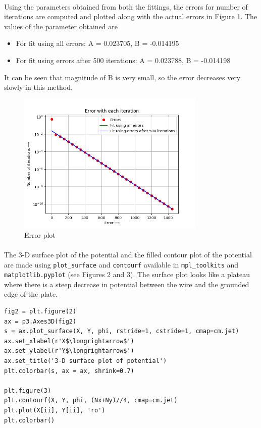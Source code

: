 \documentclass[12pt, a4paper]{article}
\begin{document}
\paragraph*{}
Using the parameters obtained from both the fittings, the errors for number of iterations are computed and plotted along with the actual errors in Figure 1. The values of the parameter obtained are 
\begin{itemize}
\item For fit using all errors: A = 0.023705, B = -0.014195
\item For fit using errors after 500 iterations: A = 0.023788, B = -0.014198
\end{itemize}
It can be seen that magnitude of B is very small, so the error decreases very slowly in this method.

\begin{figure}
\centering
\includegraphics[width=0.8\textwidth]{Figure_1.png}
\caption{Error plot}
\end{figure}

\paragraph*{}
The 3-D surface plot of the potential and the filled contour plot of the potential are made using \texttt{plot\_surface} and \texttt{contourf} available in \texttt{mpl\_toolkits} and \\ \texttt{matplotlib.pyplot} (see Figures 2 and 3). The surface plot looks like a plateau where there is a steep decrease in potential between the wire and the grounded edge of the plate.

\begin{lstlisting}
fig2 = plt.figure(2)
ax = p3.Axes3D(fig2)
s = ax.plot_surface(X, Y, phi, rstride=1, cstride=1, cmap=cm.jet)
ax.set_xlabel(r'X$\longrightarrow$')
ax.set_ylabel(r'Y$\longrightarrow$')
ax.set_title('3-D surface plot of potential')
plt.colorbar(s, ax = ax, shrink=0.7)

plt.figure(3)
plt.contourf(X, Y, phi, (Nx+Ny)//4, cmap=cm.jet)
plt.plot(X[ii], Y[ii], 'ro')
plt.colorbar()
\end{lstlisting}
\end{document}
